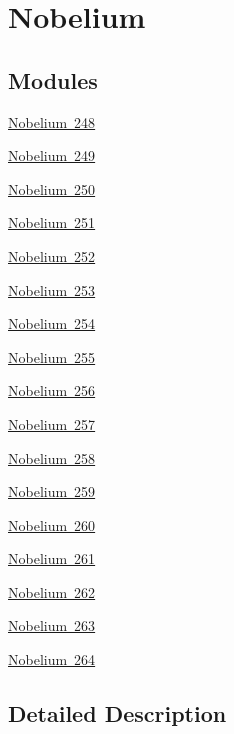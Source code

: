 \hypertarget{group___isotope_const-_nobelium}{}\section{Nobelium}
\label{group___isotope_const-_nobelium}
\subsection*{Modules}
\begin{DoxyCompactItemize}
\item 
\mbox{\hyperlink{group___isotope_const-_nobelium-_no248}{Nobelium 248}}
\item 
\mbox{\hyperlink{group___isotope_const-_nobelium-_no249}{Nobelium 249}}
\item 
\mbox{\hyperlink{group___isotope_const-_nobelium-_no250}{Nobelium 250}}
\item 
\mbox{\hyperlink{group___isotope_const-_nobelium-_no251}{Nobelium 251}}
\item 
\mbox{\hyperlink{group___isotope_const-_nobelium-_no252}{Nobelium 252}}
\item 
\mbox{\hyperlink{group___isotope_const-_nobelium-_no253}{Nobelium 253}}
\item 
\mbox{\hyperlink{group___isotope_const-_nobelium-_no254}{Nobelium 254}}
\item 
\mbox{\hyperlink{group___isotope_const-_nobelium-_no255}{Nobelium 255}}
\item 
\mbox{\hyperlink{group___isotope_const-_nobelium-_no256}{Nobelium 256}}
\item 
\mbox{\hyperlink{group___isotope_const-_nobelium-_no257}{Nobelium 257}}
\item 
\mbox{\hyperlink{group___isotope_const-_nobelium-_no258}{Nobelium 258}}
\item 
\mbox{\hyperlink{group___isotope_const-_nobelium-_no259}{Nobelium 259}}
\item 
\mbox{\hyperlink{group___isotope_const-_nobelium-_no260}{Nobelium 260}}
\item 
\mbox{\hyperlink{group___isotope_const-_nobelium-_no261}{Nobelium 261}}
\item 
\mbox{\hyperlink{group___isotope_const-_nobelium-_no262}{Nobelium 262}}
\item 
\mbox{\hyperlink{group___isotope_const-_nobelium-_no263}{Nobelium 263}}
\item 
\mbox{\hyperlink{group___isotope_const-_nobelium-_no264}{Nobelium 264}}
\end{DoxyCompactItemize}


\subsection{Detailed Description}
